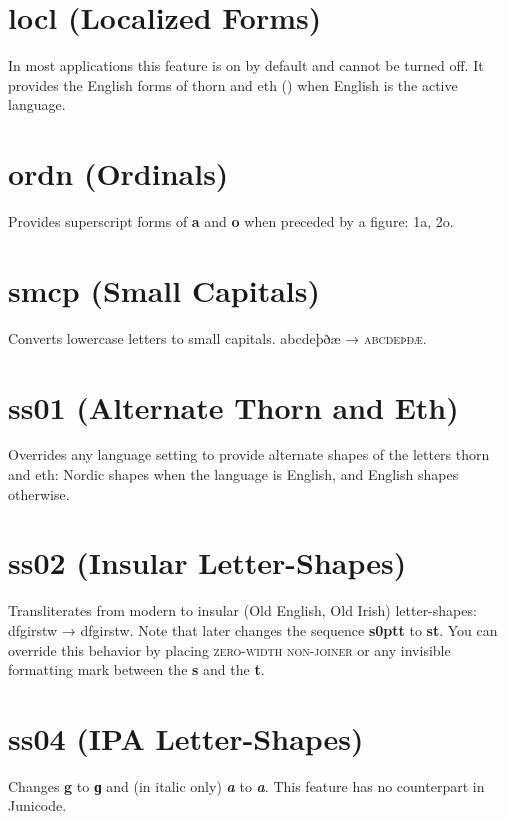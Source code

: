 \documentclass[12pt,letterpaper,openany]{book}
\begin{document}
\section{locl (Localized Forms)}
In most applications this feature is on by default and cannot be turned off.
It provides the English forms of thorn and eth
(\textbf{}) when English is the
active language.

\section{ordn (Ordinals)}
Provides superscript forms of \textbf{a} and \textbf{o} when preceded by a figure:
{ 1a, 2o}.

\section{smcp (Small Capitals)}
Converts lowercase letters to small capitals. abcdeþðæ → \textsc{abcdeþðæ}.

\section{ss01 (Alternate Thorn and Eth)}
Overrides any language setting to provide alternate shapes of the letters thorn and eth: Nordic shapes when the language is English, and English shapes otherwise.

\section{ss02 (Insular Letter-Shapes)}
Transliterates from modern to insular (Old English, Old Irish) letter-shapes:\linebreak
dfgirstw → { dfgirstw}. Note that  later
changes the sequence \textbf{ s\kern0ptt}
to \textbf{ st}. You can override this behavior by placing
 \textsc{zero-width non-joiner} or any invisible formatting mark
between the \textbf{s} and the \textbf{t}.

\section{ss04 (IPA Letter-Shapes)}
Changes \textbf{g} to \textbf{ɡ} and (in italic only)
\textbf{\textit{a}} to \textbf{\textit{ a}}. This feature has no counterpart in
Junicode.
\end{document}
